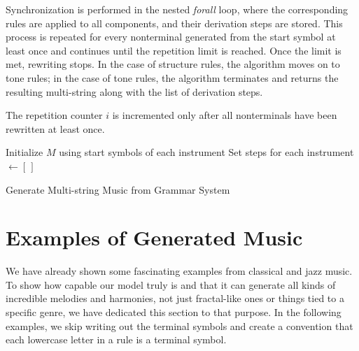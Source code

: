Synchronization is performed in the nested \textit{forall} loop, where the corresponding rules are applied to all components, and their derivation steps are stored. This process is repeated for every nonterminal generated from the start symbol at least once and continues until the repetition limit is reached. Once the limit is met, rewriting stops. In the case of structure rules, the algorithm moves on to tone rules; in the case of tone rules, the algorithm terminates and returns the resulting multi-string along with the list of derivation steps.

The repetition counter $i$ is incremented only after all nonterminals have been rewritten at least once.

\begin{algorithm}[H]
\DontPrintSemicolon
\SetAlgoLined
{}

Initialize $M$ using start symbols of each instrument\;
Set steps for each instrument $\gets [\,]$\;


\caption{Generate Multi-string Music from Grammar System}
\label{alg:multistring}
\end{algorithm}

\section{Examples of Generated Music}
We have already shown some fascinating examples from classical and jazz music. To show how capable our model truly is and that it can generate all kinds of incredible melodies and harmonies, not just fractal-like ones or things tied to a specific genre, we have dedicated this section to that purpose. In the following examples, we skip writing out the terminal symbols and create a convention that each lowercase letter in a rule is a terminal symbol.

